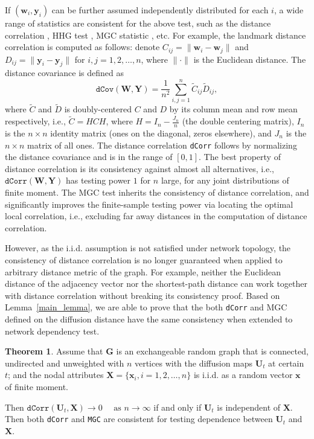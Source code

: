 \documentclass[11pt]{article}
\theoremstyle{definition}
\newtheorem{theorem}{Theorem}[section]
\begin{document}
If $(\mathbf{w}_{i}, \mathbf{y}_{i} )$ can be further assumed independently distributed for each $i$, a wide range of statistics are consistent for the above test, such as the distance correlation \cite{szekely2007measuring}, HHG test \cite{HellerGorfine2013}, MGC statistic \cite{shen2016discovering}, etc. For example, the landmark distance correlation is computed as follows: denote $C_{ij} = \parallel \mathbf{w}_{i} - \mathbf{w}_{j} \parallel$ and $D_{ij} = \parallel \mathbf{y}_{i} - \mathbf{y}_{j} \parallel$ for $i,j=1,2, \ldots ,n$, where $\parallel \cdot \parallel$ is the Euclidean distance. The distance covariance is defined as 
\begin{equation}	 
\label{eq:dCov}
\texttt{dCov}(\mathbf{W}, \mathbf{Y}) = \frac{1}{n^2} \sum\limits_{i,j=1}^{n} \tilde{C}_{ij} \tilde{D}_{ij},
\end{equation}
where $\tilde{C}$ and $\tilde{D}$ is doubly-centered $C$ and $D$ by its column mean and row mean respectively, i.e., $\tilde{C}=HCH$, where $H=I_{n}-\frac{J_{n}}{n}$ (the double centering matrix), $I_n$ is the $n \times n$ identity matrix (ones on the diagonal, zeros elsewhere), and $J_n$ is the $n \times n$ matrix of all ones. The distance correlation \texttt{dCorr} follows by normalizing the distance covariance and is in the range of $[0,1]$. The best property of distance correlation is its consistency against almost all alternatives, i.e., $\texttt{dCorr}(\mathbf{W}, \mathbf{Y})$ has testing power $1$ for $n$ large, for any joint distributions of finite moment. The MGC test inherits the consistency of distance correlation, and significantly improves the finite-sample testing power via locating the optimal local correlation, i.e., excluding far away distances in the computation of distance correlation.

However, as the i.i.d. assumption is not satisfied under network topology, the consistency of distance correlation is no longer guaranteed when applied to arbitrary distance metric of the graph. For example, neither the Euclidean distance of the adjacency vector nor the shortest-path distance can work together with distance correlation without breaking its consistency proof. Based on Lemma~\ref{main_lemma}, we are able to prove that the both \texttt{dCorr} and MGC defined on the diffusion distance have the same consistency when extended to network dependency test.

\begin{theorem}
Assume that $\mathbf{G}$ is an exchangeable random graph that is connected, undirected and unweighted with $n$ vertices with the diffusion maps $\mathbf{U}_{t}$ at certain $t$; and the nodal attributes $\mathbf{X}=\{ \mathbf{x}_{i}, i = 1,2, \ldots, n \}$ is i.i.d. as a random vector $\mathbf{x}$ of finite moment. 

Then $\texttt{dCorr}(\mathbf{U}_{t}, \mathbf{X}) \longrightarrow 0 \quad \mbox{ as } n \rightarrow \infty$ if and only if $\mathbf{U}_{t}$ is independent of $\mathbf{X}$. Then both \texttt{dCorr} and \texttt{MGC} are consistent for testing dependence between $\mathbf{U}_{t}$ and $\mathbf{X}$.
	\label{theoremMain}
\end{theorem}
\end{document}
